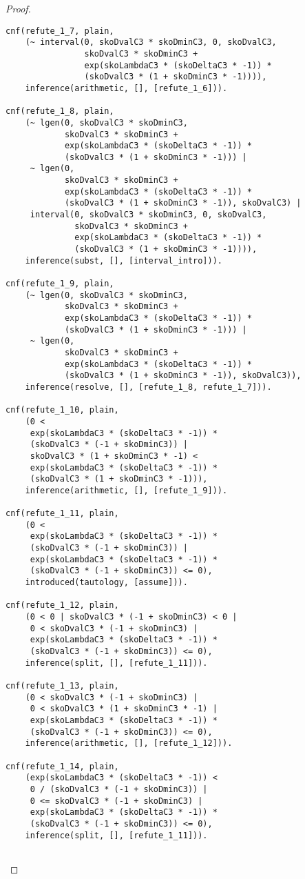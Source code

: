 \begin{proof}
\begin{verbatim}
cnf(refute_1_7, plain,
    (~ interval(0, skoDvalC3 * skoDminC3, 0, skoDvalC3,
                skoDvalC3 * skoDminC3 +
                exp(skoLambdaC3 * (skoDeltaC3 * -1)) *
                (skoDvalC3 * (1 + skoDminC3 * -1)))),
    inference(arithmetic, [], [refute_1_6])).

cnf(refute_1_8, plain,
    (~ lgen(0, skoDvalC3 * skoDminC3,
            skoDvalC3 * skoDminC3 +
            exp(skoLambdaC3 * (skoDeltaC3 * -1)) *
            (skoDvalC3 * (1 + skoDminC3 * -1))) |
     ~ lgen(0,
            skoDvalC3 * skoDminC3 +
            exp(skoLambdaC3 * (skoDeltaC3 * -1)) *
            (skoDvalC3 * (1 + skoDminC3 * -1)), skoDvalC3) |
     interval(0, skoDvalC3 * skoDminC3, 0, skoDvalC3,
              skoDvalC3 * skoDminC3 +
              exp(skoLambdaC3 * (skoDeltaC3 * -1)) *
              (skoDvalC3 * (1 + skoDminC3 * -1)))),
    inference(subst, [], [interval_intro])).

cnf(refute_1_9, plain,
    (~ lgen(0, skoDvalC3 * skoDminC3,
            skoDvalC3 * skoDminC3 +
            exp(skoLambdaC3 * (skoDeltaC3 * -1)) *
            (skoDvalC3 * (1 + skoDminC3 * -1))) |
     ~ lgen(0,
            skoDvalC3 * skoDminC3 +
            exp(skoLambdaC3 * (skoDeltaC3 * -1)) *
            (skoDvalC3 * (1 + skoDminC3 * -1)), skoDvalC3)),
    inference(resolve, [], [refute_1_8, refute_1_7])).

cnf(refute_1_10, plain,
    (0 <
     exp(skoLambdaC3 * (skoDeltaC3 * -1)) *
     (skoDvalC3 * (-1 + skoDminC3)) |
     skoDvalC3 * (1 + skoDminC3 * -1) <
     exp(skoLambdaC3 * (skoDeltaC3 * -1)) *
     (skoDvalC3 * (1 + skoDminC3 * -1))),
    inference(arithmetic, [], [refute_1_9])).

cnf(refute_1_11, plain,
    (0 <
     exp(skoLambdaC3 * (skoDeltaC3 * -1)) *
     (skoDvalC3 * (-1 + skoDminC3)) |
     exp(skoLambdaC3 * (skoDeltaC3 * -1)) *
     (skoDvalC3 * (-1 + skoDminC3)) <= 0),
    introduced(tautology, [assume])).

cnf(refute_1_12, plain,
    (0 < 0 | skoDvalC3 * (-1 + skoDminC3) < 0 |
     0 < skoDvalC3 * (-1 + skoDminC3) |
     exp(skoLambdaC3 * (skoDeltaC3 * -1)) *
     (skoDvalC3 * (-1 + skoDminC3)) <= 0),
    inference(split, [], [refute_1_11])).

cnf(refute_1_13, plain,
    (0 < skoDvalC3 * (-1 + skoDminC3) |
     0 < skoDvalC3 * (1 + skoDminC3 * -1) |
     exp(skoLambdaC3 * (skoDeltaC3 * -1)) *
     (skoDvalC3 * (-1 + skoDminC3)) <= 0),
    inference(arithmetic, [], [refute_1_12])).

cnf(refute_1_14, plain,
    (exp(skoLambdaC3 * (skoDeltaC3 * -1)) <
     0 / (skoDvalC3 * (-1 + skoDminC3)) |
     0 <= skoDvalC3 * (-1 + skoDminC3) |
     exp(skoLambdaC3 * (skoDeltaC3 * -1)) *
     (skoDvalC3 * (-1 + skoDminC3)) <= 0),
    inference(split, [], [refute_1_11])).


\end{verbatim}
\end{proof}

